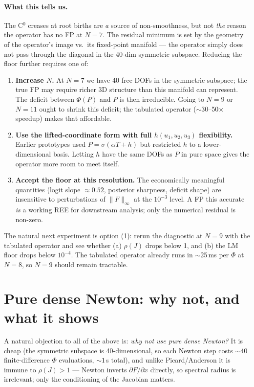 \documentclass[11pt]{article}
\begin{document}
\paragraph{What this tells us.} The C$^0$ creases at root births are
\emph{a} source of non-smoothness, but not \emph{the} reason the operator
has no FP at $N{=}7$. The residual minimum is set by the geometry of the
operator's image vs.\ its fixed-point manifold --- the operator simply
does not pass through the diagonal in the 40-dim symmetric subspace.
Reducing the floor further requires one of:

\begin{enumerate}
  \item \textbf{Increase $N$.} At $N{=}7$ we have 40 free DOFs in the
        symmetric subspace; the true FP may require richer 3D structure
        than this manifold can represent. The deficit between $\Phi(P)$
        and $P$ is then irreducible. Going to $N{=}9$ or $N{=}11$ ought
        to shrink this deficit; the tabulated operator ($\sim$30--50$\times$
        speedup) makes that affordable.
  \item \textbf{Use the lifted-coordinate form with full $h(u_1,u_2,u_3)$
        flexibility.} Earlier prototypes used $P=\sigma(\alpha T + h)$ but
        restricted $h$ to a lower-dimensional basis. Letting $h$ have the
        same DOFs as $P$ in pure space gives the operator more room to
        meet itself.
  \item \textbf{Accept the floor at this resolution.} The economically
        meaningful quantities (logit slope $\approx 0.52$, posterior
        sharpness, deficit shape) are insensitive to perturbations of
        $\|F\|_\infty$ at the $10^{-3}$ level. A FP this accurate
        \emph{is} a working REE for downstream analysis; only the
        numerical residual is non-zero.
\end{enumerate}

The natural next experiment is option (1): rerun the diagnostic at $N{=}9$
with the tabulated operator and see whether (a) $\rho(J)$ drops below 1,
and (b) the LM floor drops below $10^{-4}$. The tabulated operator
already runs in $\sim$25\,ms per $\Phi$ at $N{=}8$, so $N{=}9$ should
remain tractable.

\section{Pure dense Newton: why not, and what it shows}

A natural objection to all of the above is: \emph{why not use pure dense
Newton?} It is cheap (the symmetric subspace is 40-dimensional, so each
Newton step costs $\sim 40$ finite-difference $\Phi$ evaluations, $\sim 1$\,s
total), and unlike Picard/Anderson it is immune to $\rho(J) > 1$ ---
Newton inverts $\partial F / \partial x$ directly, so spectral radius is
irrelevant; only the conditioning of the Jacobian matters.
\end{document}
